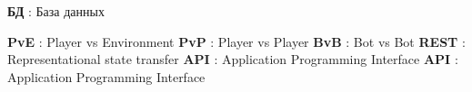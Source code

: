 \printnomenclature[3.5cm] %

\textbf{БД} : База данных

\textbf{PvE} : Player vs Environment
\textbf{PvP} : Player vs Player
\textbf{BvB} : Bot vs Bot
\textbf{REST} : Representational state transfer 
\textbf{API} : Application Programming Interface
\textbf{API} : Application Programming Interface
